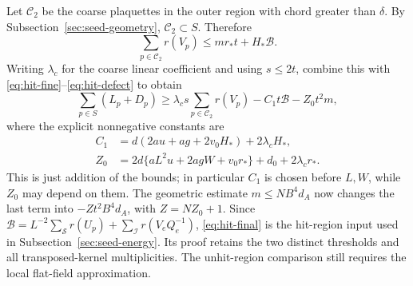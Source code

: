 Let $\mathcal C_2$ be the coarse plaquettes in the outer region with
chord greater than $\delta$. By Subsection~\ref{sec:seed-geometry},
$\mathcal C_2\subset S$. Therefore
\[
 \sum_{p\in\mathcal C_2}r(V_p)\le mr_*t+H_*\mathcal B.
\]
Writing $\lambda_c$ for the coarse linear coefficient and using
$s\le2t$, combine this with \eqref{eq:hit-fine}--\eqref{eq:hit-defect}
to obtain
\begin{equation}\label{eq:hit-final}
 \sum_{p\in S}(L_p+D_p)
 \ge\lambda_cs\sum_{p\in\mathcal C_2}r(V_p)
       -C_1t\mathcal B-Z_0t^2m,
\end{equation}
where the explicit nonnegative constants are
\[
 \begin{split}
 C_1&=d(2au+ag+2v_0H_*)+2\lambda_cH_*,\\
 Z_0&=2d\{aL^2u+2agW+v_0r_*\}+d_0+2\lambda_cr_*.
 \end{split}
\]
This is just addition of the bounds; in particular $C_1$ is chosen
before $L,W$, while $Z_0$ may depend on them. The geometric estimate
$m\le NB^4d_A$ now changes the last term into
$-Zt^2B^4d_A$, with $Z=NZ_0+1$. Since
$\mathcal B=L^{-2}\sum_{\mathcal S}r(U_p)+\sum_{\mathcal I}r(V_eQ_e^{-1})$,
\eqref{eq:hit-final} is the hit-region input used in
Subsection~\ref{sec:seed-energy}. Its proof retains the two distinct
thresholds and all transposed-kernel multiplicities. The unhit-region
comparison still requires the local flat-field approximation.
